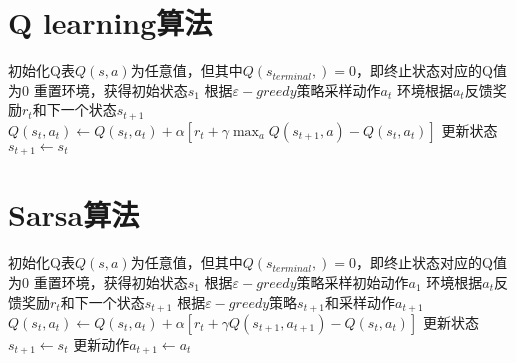 \documentclass[11pt]{ctexart}
\begin{document}
\section{Q learning算法}
\begin{algorithm}[H] %
	\renewcommand{\thealgorithm}{} %
	\caption{} 
	\begin{algorithmic}[1] %
		\STATE 初始化Q表$Q(s,a)$为任意值，但其中$Q(s_{terminal},)=0$，即终止状态对应的Q值为0
			\STATE 重置环境，获得初始状态$s_1$
				\STATE 根据$\varepsilon-greedy$策略采样动作$a_t$
				\STATE 环境根据$a_t$反馈奖励$r_t$和下一个状态$s_{t+1}$
				\STATE $Q(s_t,a_t) \leftarrow Q(s_t,a_t)+\alpha[r_t+\gamma\max _{a}Q(s_{t+1},a)-Q(s_t,a_t)]$
				\STATE 更新状态$s_{t+1} \leftarrow s_t$
			\ENDFOR
		\ENDFOR
	\end{algorithmic}
\end{algorithm}
\clearpage
\section{Sarsa算法}
\begin{algorithm}[H] %
	\renewcommand{\thealgorithm}{} %
	\caption{} 
	\begin{algorithmic}[1] %
		\STATE 初始化Q表$Q(s,a)$为任意值，但其中$Q(s_{terminal},)=0$，即终止状态对应的Q值为0
			\STATE 重置环境，获得初始状态$s_1$
			\STATE 根据$\varepsilon-greedy$策略采样初始动作$a_1$
				\STATE 环境根据$a_t$反馈奖励$r_t$和下一个状态$s_{t+1}$
				\STATE 根据$\varepsilon-greedy$策略$s_{t+1}$和采样动作$a_{t+1}$
				\STATE $Q(s_t,a_t) \leftarrow Q(s_t,a_t)+\alpha[r_t+\gamma Q(s_{t+1},a_{t+1})-Q(s_t,a_t)]$
				\STATE 更新状态$s_{t+1} \leftarrow s_t$
				\STATE 更新动作$a_{t+1} \leftarrow a_t$
			\ENDFOR
		\ENDFOR
	\end{algorithmic}
\end{algorithm}
\clearpage
\end{document}
